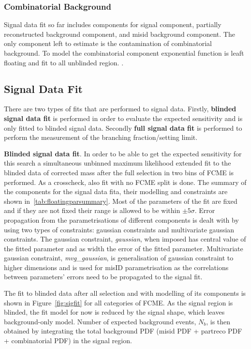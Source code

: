 \subsubsection{Combinatorial Background}
Signal data fit so far includes components for signal component, partially reconstructed background component, and misid background component. The only component left to estimate is the contamination of combinatorial background. To model the combinatorial component exponential function is leaft floating and fit to all unblinded region. .

\subsection{Signal Data Fit}
\label{fitsens}

There are two types of fits that are performed to signal data. Firstly, \textbf{blinded signal data fit} is performed in order to evaluate the expected sensitivity and is only fitted to blinded signal data. Secondly \textbf{full signal data fit} is performed to perform the measurement of the branching fraction/setting limit.


\textbf{Blinded signal data fit}.
In order to be able to get the expected sensitivity for this search a simultaneous unbinned maximum likelihood extended fit to the blinded data of corrected mass after the full selection in two bins of FCME is performed. As a crosscheck, also fit with no FCME split is done. The summary of the components for the signal data fita, their modelling and constraints are shown in~\autoref{tab:floatingparsummary}. Most of the parameters of the fit are fixed and if they are not fixed their range is allowed to be within $\pm5\sigma$. Error propagation from the parametrisations of different components is dealt with by using two types of constraints: gaussian constraints and multivariate gaussian constraints. The gaussian constraint, \textit{gaussian}, when imposed has central value of the fitted parameter and as width the error of the fitted parameter. Multivariate gaussian constraint, \textit{mvg\_gaussian}, is generalisation of gaussian constraint to higher dimensions and is used for misID parametrisation as the correlations between parameters' errors need to be propagated to the signal fit.

The fit to blinded data after all selection and with modelling of its components is shown in Figure~\ref{fig:sigfit} for all categories of FCME. As the signal region is blinded, the fit model for now is reduced by the signal shape, which leaves background-only model. Number of expected background events, $N_b$, is then obtained by integrating the total background PDF (misid PDF + partreco PDF + combinatorial PDF) in the signal region.


